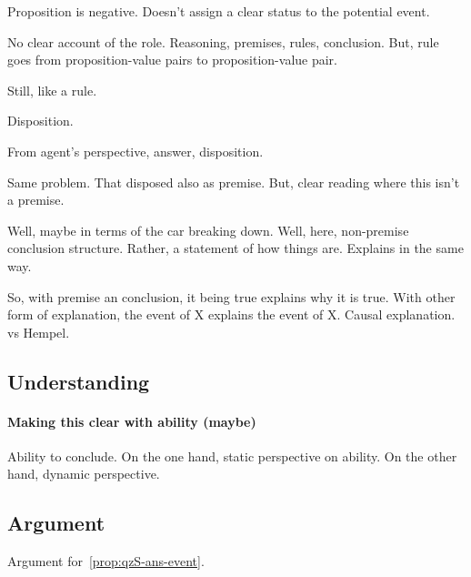 \begin{note}
  Proposition is negative.
  Doesn't assign a clear status to the potential event.

  No clear account of the role.
  Reasoning, premises, rules, conclusion.
  But, rule goes from proposition-value pairs to proposition-value pair.

  Still, like a rule.
\end{note}

\begin{note}
  Disposition.

  From agent's perspective, answer, disposition.

  Same problem.
  That disposed also as premise.
  But, clear reading where this isn't a premise.

  Well, maybe in terms of the car breaking down.
  Well, here, non-premise conclusion structure.
  Rather, a statement of how things are.
  Explains in the same way.

  So, with premise an conclusion, it being true explains why it is true.
  With other form of explanation, the event of X explains the event of X.
  Causal explanation.
  \citeauthor{Scriven:1962vq} vs Hempel.
\end{note}


\subsection{Understanding}
\label{sec:understanding}

\paragraph{Making this clear with ability (maybe)}

\begin{note}
  Ability to conclude.
  On the one hand, static perspective on ability.
  On the other hand, dynamic perspective.
\end{note}

\subsection{Argument}
\label{sec:argument-1}

\begin{note}
  Argument for~\autoref{prop:qzS-ans-event}.
\end{note}

